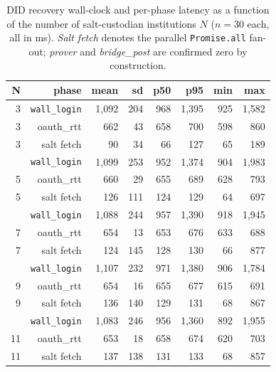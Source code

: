 \begin{table}[h]
\centering
\small
\caption{DID recovery wall-clock and per-phase latency as a function of
the number of salt-custodian institutions $N$ ($n=30$ each, all in ms).
\emph{Salt fetch} denotes the parallel \texttt{Promise.all} fan-out;
\emph{prover} and \emph{bridge\_post} are confirmed zero by construction.}
\label{tab:recovery-scaling}
\begin{tabular}{rrrrrrrr}
\toprule
\textbf{N} & \textbf{phase}     & \textbf{mean} & \textbf{sd} & \textbf{p50} & \textbf{p95} & \textbf{min} & \textbf{max} \\
\midrule
3  & \texttt{wall\_login} & 1{,}092 & 204 &    968 & 1{,}395 &    925 & 1{,}582 \\
3  & oauth\_rtt           &    662 &  43 &    658 &    700 &    598 &    860 \\
3  & salt fetch           &     90 &  34 &     66 &    127 &     65 &    189 \\
\addlinespace
5  & \texttt{wall\_login} & 1{,}099 & 253 &    952 & 1{,}374 &    904 & 1{,}983 \\
5  & oauth\_rtt           &    660 &  29 &    655 &    689 &    628 &    793 \\
5  & salt fetch           &    126 & 111 &    124 &    129 &     64 &    697 \\
\addlinespace
7  & \texttt{wall\_login} & 1{,}088 & 244 &    957 & 1{,}390 &    918 & 1{,}945 \\
7  & oauth\_rtt           &    654 &  13 &    653 &    676 &    633 &    688 \\
7  & salt fetch           &    124 & 145 &    128 &    130 &     66 &    877 \\
\addlinespace
9  & \texttt{wall\_login} & 1{,}107 & 232 &    971 & 1{,}380 &    906 & 1{,}784 \\
9  & oauth\_rtt           &    654 &  16 &    655 &    677 &    615 &    691 \\
9  & salt fetch           &    136 & 140 &    129 &    131 &     68 &    867 \\
\addlinespace
11 & \texttt{wall\_login} & 1{,}083 & 246 &    956 & 1{,}360 &    892 & 1{,}955 \\
11 & oauth\_rtt           &    653 &  18 &    658 &    674 &    620 &    703 \\
11 & salt fetch           &    137 & 138 &    131 &    133 &     68 &    857 \\
\bottomrule
\end{tabular}
\end{table}

